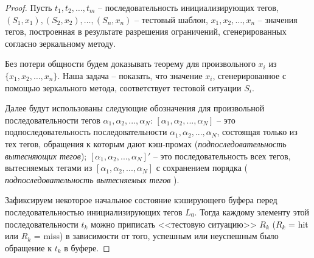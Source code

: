 \theoremtext{\ref{mirror_correctness}}{\CorrectnessMirror}
\begin{proof}
  Пусть $t_1, t_2, \dots, t_m$ -- последовательность
  инициализирующих тегов, $(S_1, x_1), (S_2, x_2), \dots, (S_n,
  x_n)$ -- тестовый шаблон, $x_1, x_2, \dots, x_n$ -- значения
  тегов, построенная в результате разрешения ограничений,
  сгенерированных согласно зеркальному методу.

  Без потери общности будем доказывать теорему для произвольного
  $x_i$ из $\{x_1, x_2, \dots, x_n\}$. Наша задача -- показать, что значение $x_i$,
  сгенерированное с помощью зеркального метода, соответствует
  тестовой ситуации $S_i$.

  Далее будут использованы следующие обозначения для произвольной
  последовательности тегов $\alpha_1, \alpha_2, ..., \alpha_N$:
  $[\alpha_1, \alpha_2, ..., \alpha_N]$ -- это подпоследовательность
  последовательности $\alpha_1, \alpha_2, ..., \alpha_N$, состоящая
  только из тех тегов, обращения к которым дают кэш-промах
  (\emph{подпоследовательность вытесняющих тегов}); $[\alpha_1,
  \alpha_2, ..., \alpha_N]'$ -- это последовательность всех тегов,
  вытесняемых тегами из $[\alpha_1, \alpha_2, ..., \alpha_N]$ с
  сохранением порядка ( \emph{подпоследовательность вытесняемых
  тегов} ).

  Зафиксируем некоторое начальное состояние кэширующего буфера перед
  последовательностью инициализирующих тегов $L_0$. Тогда каждому
  элементу этой последовательности $t_k$ можно приписать <<тестовую
  ситуацию>> $R_k$ ($R_k$ = hit или $R_k$ = miss) в зависимости от
  того, успешным или неуспешным было обращение к $t_k$ в буфере.


\end{proof}
